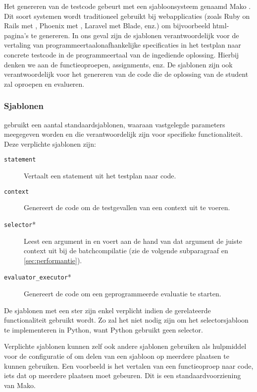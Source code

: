 Het genereren van de testcode gebeurt met een sjabloonsysteem genaamd Mako \autocite{mako}.
Dit soort systemen wordt traditioneel gebruikt bij webapplicaties (zoals Ruby on Rails met , Phoenix met , Laravel met Blade, enz.) om bijvoorbeeld html-pagina's te genereren.
In ons geval zijn de sjablonen verantwoordelijk voor de vertaling van programmeertaalonafhankelijke specificaties in het testplan naar concrete testcode in de programmeertaal van de ingediende oplossing.
Hierbij denken we aan de functieoproepen, assignments, enz.
De sjablonen zijn ook verantwoordelijk voor het genereren van de code die de oplossing van de student zal oproepen en evalueren.

\subsubsection{Sjablonen}

\tested{} gebruikt een aantal standaardsjablonen, waaraan vastgelegde parameters meegegeven worden en die verantwoordelijk zijn voor specifieke functionaliteit.
Deze verplichte sjablonen zijn:

\begin{description}
    \item[\texttt{statement}] Vertaalt een statement uit het testplan naar code.
    \item[\texttt{context}] Genereert de code om de testgevallen van een context uit te voeren.
    \item[\texttt{selector}*] Leest een argument in en voert aan de hand van dat argument de juiste context uit bij de batchcompilatie (zie de volgende subparagraaf en \cref{sec:performantie}).
    \item[\texttt{evaluator\_executor}*] Genereert de code om een geprogrammeerde evaluatie te starten.
\end{description}

De sjablonen met een ster zijn enkel verplicht indien de gerelateerde functionaliteit gebruikt wordt.
Zo zal het niet nodig zijn om het selectorsjabloon te implementeren in Python, want Python gebruikt geen selector.

Verplichte sjablonen kunnen zelf ook andere sjablonen gebruiken als hulpmiddel voor de configuratie of om delen van een sjabloon op meerdere plaatsen te kunnen gebruiken.
Een voorbeeld is het vertalen van een functieoproep naar code, iets dat op meerdere plaatsen moet gebeuren.
Dit is een standaardvoorziening van Mako.

